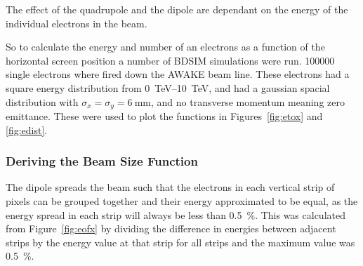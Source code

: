 The effect of the quadrupole and the dipole are dependant on the energy of the
individual electrons in the beam.




So to calculate the energy and number of an electrons as a function of the
horizontal screen position a number of BDSIM simulations were run. \num{100 000}
single electrons where fired down the AWAKE beam line.  These electrons had a
square energy distribution from \SIrange{0}{10}{\tera\electronvolt}, and had a
gaussian spacial distribution with \(\sigma_x = \sigma_y =
\SI{6}{\milli\meter}\), and no transverse momentum meaning zero emittance. These
were used to plot the functions in Figures~\ref{fig:etox} and \ref{fig:edist}.


\subsubsection{Deriving the Beam Size Function}

The dipole spreads the beam such that the
electrons in each vertical strip of pixels can be grouped together and their
energy approximated to be equal, as the energy spread in each strip will always
be less than \SI{0.5}{\percent}. This was calculated from Figure~\ref{fig:eofx}
by dividing the difference in energies between adjacent strips by the energy
value at that strip for all strips and the maximum value was \SI{0.5}{\percent}.



